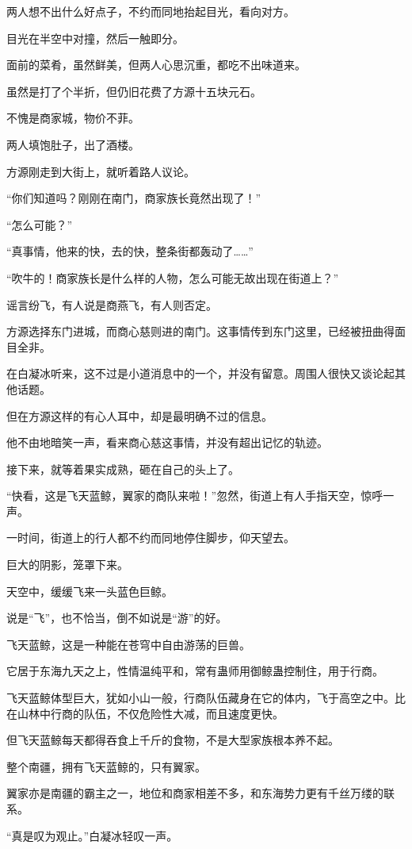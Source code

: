 \begin{this_body}
两人想不出什么好点子，不约而同地抬起目光，看向对方。

目光在半空中对撞，然后一触即分。

面前的菜肴，虽然鲜美，但两人心思沉重，都吃不出味道来。

虽然是打了个半折，但仍旧花费了方源十五块元石。

不愧是商家城，物价不菲。

两人填饱肚子，出了酒楼。

方源刚走到大街上，就听着路人议论。

“你们知道吗？刚刚在南门，商家族长竟然出现了！”

“怎么可能？”

“真事情，他来的快，去的快，整条街都轰动了……”

“吹牛的！商家族长是什么样的人物，怎么可能无故出现在街道上？”

谣言纷飞，有人说是商燕飞，有人则否定。

方源选择东门进城，而商心慈则进的南门。这事情传到东门这里，已经被扭曲得面目全非。

在白凝冰听来，这不过是小道消息中的一个，并没有留意。周围人很快又谈论起其他话题。

但在方源这样的有心人耳中，却是最明确不过的信息。

他不由地暗笑一声，看来商心慈这事情，并没有超出记忆的轨迹。

接下来，就等着果实成熟，砸在自己的头上了。

“快看，这是飞天蓝鲸，翼家的商队来啦！”忽然，街道上有人手指天空，惊呼一声。

一时间，街道上的行人都不约而同地停住脚步，仰天望去。

巨大的阴影，笼罩下来。

天空中，缓缓飞来一头蓝色巨鲸。

说是“飞”，也不恰当，倒不如说是“游”的好。

飞天蓝鲸，这是一种能在苍穹中自由游荡的巨兽。

它居于东海九天之上，性情温纯平和，常有蛊师用御鲸蛊控制住，用于行商。

飞天蓝鲸体型巨大，犹如小山一般，行商队伍藏身在它的体内，飞于高空之中。比在山林中行商的队伍，不仅危险性大减，而且速度更快。

但飞天蓝鲸每天都得吞食上千斤的食物，不是大型家族根本养不起。

整个南疆，拥有飞天蓝鲸的，只有翼家。

翼家亦是南疆的霸主之一，地位和商家相差不多，和东海势力更有千丝万缕的联系。

“真是叹为观止。”白凝冰轻叹一声。


\end{this_body}
